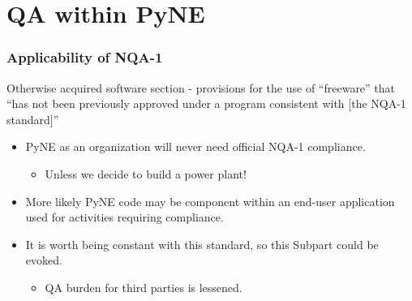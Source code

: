 \documentclass[12pt]{beamer}
\begin{document}
\section{QA within PyNE}
%
%
%
%
\begin{frame}
\frametitle{Applicability of NQA-1}


\alert{Otherwise acquired software} section - provisions for the use of
``freeware'' that ``has not been previously approved under a program consistent
with [the NQA-1 standard]''

\begin{itemize}
\item{PyNE as an organization will never need official NQA-1 compliance.}
    \begin{itemize}
    \item{Unless we decide to build a power plant!}
    \end{itemize}
\item{More likely PyNE code may be component within an end-user application used for activities requiring compliance.}
\item{It is worth being constant with this standard, so this Subpart could be evoked.}
    \begin{itemize}
    \item{QA burden for third parties is lessened.}
    \end{itemize}
\end{itemize}

\end{frame}
\end{document}
